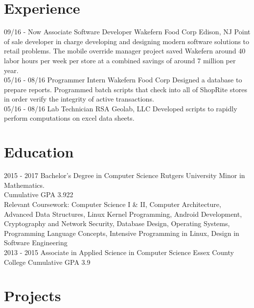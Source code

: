 \section{Experience}
\begin{entrylist}
  \entry
    {09/16 - Now}
    {Associate Software Developer}
    {Wakefern Food Corp Edison, NJ}
    {Point of sale developer in charge developing and     
     designing modern software solutions to retail problems. 
     The mobile override manager project saved Wakefern around 40 labor hours per week per store at a combined savings of around 7 million per year.\\}
  \entry
    {05/16 - 08/16}
    {Programmer Intern}
    {Wakefern Food Corp}
    {Designed a database to prepare reports. Programmed batch scripts that check into all of ShopRite stores in order verify the integrity of active transactions.\\}
    \entry
    {05/16 - 08/16}
    {Lab Technician}
    {RSA Geolab, LLC}
    {Developed scripts to rapidly perform computations on excel data sheets.}
\end{entrylist}
\section{Education}
\begin{entrylist}
  \entry
    {2015 - 2017}
    {Bachelor's Degree in Computer Science}
    {Rutgers University}
    {Minor in Mathematics.\\
    Cumulative GPA 3.922\\
    Relevant Coursework: Computer Science I \& II, Computer Architecture, Advanced Data Structures, Linux Kernel Programming, Android Development, Cryptography and Network Security, Database Design, Operating Systems, Programming Language Concepts, Intensive Programming in Linux, Design in Software Engineering\\}
  \entry
    {2013 - 2015}
    {Associate in Applied Science in Computer Science}
    {Essex County College}
    {Cumulative GPA 3.9\\
    }
\end{entrylist}

\section{Projects}

